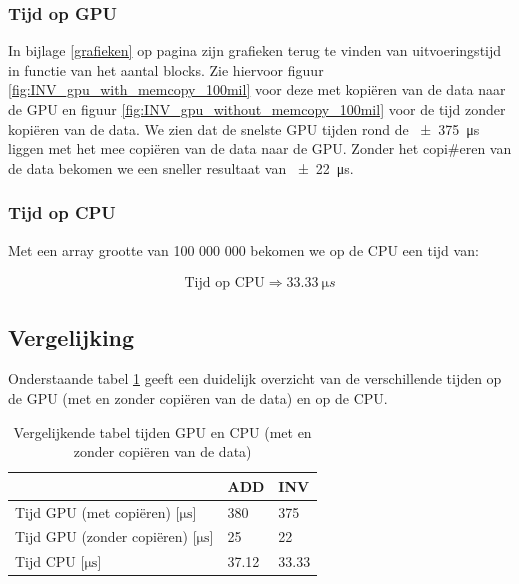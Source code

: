 \documentclass[twoside,a4paper]{article}
\begin{document}
\subsubsection{Tijd op GPU}
In bijlage \ref{grafieken} op pagina \pageref{grafieken} zijn grafieken terug te vinden van uitvoeringstijd in functie van het aantal blocks.
Zie hiervoor figuur \ref{fig:INV_gpu_with_memcopy_100mil} voor deze met kopi\"eren van de data naar de GPU en figuur \ref{fig:INV_gpu_without_memcopy_100mil} voor de tijd zonder kopi\"eren van de data.
We zien dat de snelste GPU tijden rond de \SI{\pm375}{\micro s} liggen met het mee copi\"eren van de data naar de GPU. Zonder het copi\#eren van de data bekomen we een sneller resultaat van \SI{\pm22}{\micro s}.


\subsubsection{Tijd op CPU}
Met een array grootte van 100 000 000 bekomen we op de CPU een tijd van:

\begin{align*}
    \text{Tijd op CPU} \Rightarrow \SI{33.33}{\micro s}
\end{align*}



\subsection{Vergelijking}
Onderstaande tabel \ref{tab:vgl} geeft een duidelijk overzicht van de verschillende tijden op de GPU (met en zonder copi\"eren van de data) en op de CPU.

\begin{table}[h!]
    \centering
    \begin{tabular}{@{}lll@{}}
    \toprule
                                      & ADD   & INV   \\ \midrule
    Tijd GPU (met copi\"eren) [$\mathrm{\mu s}$] & 380   & 375   \\
    Tijd GPU (zonder copi\"eren) [$\mathrm{\mu s}$]   & 25    & 22    \\
    Tijd CPU [$\mathrm{\mu s}$]                         & 37.12 & 33.33 \\ \bottomrule
    \end{tabular}
    \caption{Vergelijkende tabel tijden GPU en CPU (met en zonder copi\"eren van de data)}
    \label{tab:vgl}
    \end{table}
\end{document}
